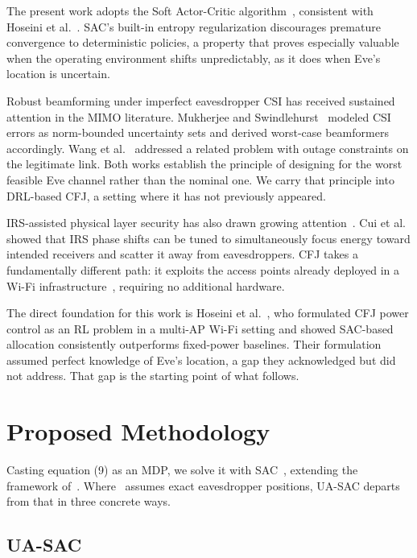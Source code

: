 \documentclass[conference]{IEEEtran}
\begin{document}
The present work adopts the Soft Actor-Critic algorithm~\cite{sac1,sac2}, consistent with Hoseini et al.~\cite{hoseini}. SAC's built-in entropy regularization discourages premature convergence to deterministic policies, a property that proves especially valuable when the operating environment shifts unpredictably, as it does when Eve's location is uncertain.

Robust beamforming under imperfect eavesdropper CSI has received sustained attention in the MIMO literature. Mukherjee and Swindlehurst~\cite{mukherjee} modeled CSI errors as norm-bounded uncertainty sets and derived worst-case beamformers accordingly. Wang et al.~\cite{wang} addressed a related problem with outage constraints on the legitimate link. Both works establish the principle of designing for the worst feasible Eve channel rather than the nominal one. We carry that principle into DRL-based CFJ, a setting where it has not previously appeared.

IRS-assisted physical layer security has also drawn growing attention~\cite{cui,yang}. Cui et al.~\cite{cui} showed that IRS phase shifts can be tuned to simultaneously focus energy toward intended receivers and scatter it away from eavesdroppers. CFJ takes a fundamentally different path: it exploits the access points already deployed in a Wi-Fi infrastructure~\cite{wifi5,spectrum}, requiring no additional hardware.

The direct foundation for this work is Hoseini et al.~\cite{hoseini}, who formulated CFJ power control as an RL problem in a multi-AP Wi-Fi setting and showed SAC-based allocation consistently outperforms fixed-power baselines. Their formulation assumed perfect knowledge of Eve's location, a gap they acknowledged but did not address. That gap is the starting point of what follows.

\section{Proposed Methodology}

Casting equation (9) as an MDP, we solve it with SAC~\cite{sac1,sac2}, extending the framework of~\cite{hoseini}. Where~\cite{hoseini} assumes exact eavesdropper positions, UA-SAC departs from that in three concrete ways.

\subsection{UA-SAC}
\end{document}

